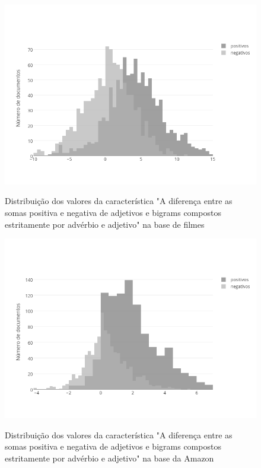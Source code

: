 \documentclass[template.tex]{subfiles}
\begin{document}
\begin{figure}[phtb]
\caption{Distribuição dos valores da característica "A diferença entre as somas positiva e negativa de adjetivos e bigrams compostos estritamente por advérbio e adjetivo" na base de filmes}
\centering
\includegraphics[scale=0.7]{movies_positive_to_negative_ratio_of_unigrams_and_bigrams_sum}
\label{figura:movies_dist_2}
\end{figure}


\begin{figure}[phtb]
\caption{Distribuição dos valores da característica "A diferença entre as somas positiva e negativa de adjetivos e bigrams compostos estritamente por advérbio e adjetivo" na base da Amazon}
\centering
\includegraphics[scale=0.7]{amazon_positive_to_negative_ratio_of_adjectives_sum_and_bigrams_with_adjectives}
\label{figura:amazon_dist_1}
\end{figure}
\end{document}
